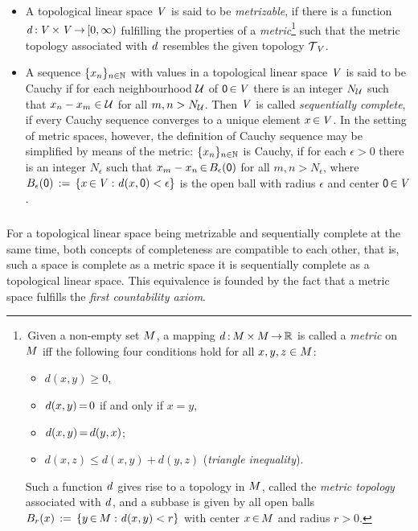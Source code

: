 \documentclass[11pt,twoside]{article}
\begin{document}
\begin{itemize}[leftmargin=12pt,itemsep=5pt]
\item[1.]
A topological linear space $\mathit{V}$ is said to be \textit{metrizable},
if there is a function
$\mathit{d}{\,:\,}\mathit{V} {\,\times\,} \mathit{V} {\,\to\,} [0,\infty)$
fulfilling the properties of a \textit{metric}\footnote{
\,Given a non-empty set $M$,
a mapping $\mathit{d}{\,:\,}M {\,\times\,} M {\,\to\,} {\mathbb{R}}$ is called a \textit{metric}
on $M$
iff the following four conditions hold for all $x,y,z \in M$:

\begin{itemize}[leftmargin=40pt,itemsep=0pt]
\item[(M-1)]
$d(x,y) \geq 0$,
\item[(M-2)]
$d(x,y) {\,=\,} 0$ if and only if $x=y$,
\item[(M-3)]
$d(x,y) {\,=\,} d(y,x)$;
\item[(M-4)]
$d(x,z) \leq d(x,y) + d(y,z)$ \hspace{3mm}(\textit{triangle inequality}).
\end{itemize}

Such a function $\mathit{d}$ gives rise to a topology in $M$,
called the \textit{metric topology} associated with $\mathit{d}$,
and a subbase is given by all open balls
$B_r(x) \,:=\, \{y {\,\in\,} M: \mathit{d}(x,y) < r\}$
with center $x {\,\in\,} M$ and radius $r > 0$.
}
such that the metric topology associated with $\mathit{d}$
resembles the given topology $\mathcal{T}_{\,\mathit{V}}$.

\item[2.]
A sequence $\{x_n\}_{n \in {\mathbb{N}}}$ with values
in a topological linear space $\mathit{V}$ is said to be Cauchy
if for each neighbourhood $\mathcal{U}$ of ${\mathsf{0}} {\,\in\,} \mathit{V}$
there is an integer $N_{\mathcal{U}}$
such that $x_n - x_m \in \mathcal{U}$ for all $m,n > N_{\mathcal{U}}$.
Then $\mathit{V}$ is called \textit{sequentially complete},
if every Cauchy sequence converges to a unique element $x {\,\in\,} \mathit{V}$.
In the setting of metric spaces,
however,
the definition of Cauchy sequence may be simplified by means of the metric:
$\{x_n\}_{n \in {\mathbb{N}}}$ is Cauchy,
if for each $\epsilon > 0$ there is an integer $N_{\epsilon}$ 
such that
$x_m - x_n {\,\in\,} B_{\epsilon}({\mathsf{0}})$ for all $m,n > N_{\epsilon}$,
where $B_{\epsilon}({\mathsf{0}}) \,:=\, \{x {\,\in\,} \mathit{V}: \mathit{d}(x,{\mathsf{0}}) < \epsilon\}$
is the open ball with radius $\epsilon$ and center ${\mathsf{0}} {\,\in\,} \mathit{V}$.
\end{itemize}

\subparagraph{}
For a topological linear space being metrizable and sequentially complete
at the same time,
both concepts of completeness are compatible to each other,
that is,
such a space is complete as a metric space
\iff
it is sequentially complete as a topological linear space.
This equivalence is founded by the fact
that a metric space fulfills the \textit{first countability axiom}.
\end{document}
